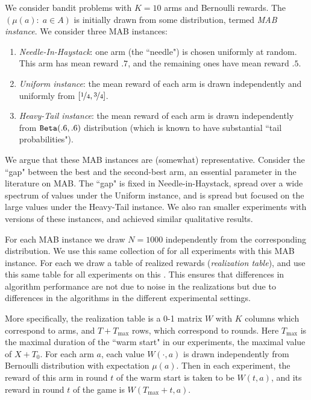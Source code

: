 \documentclass[../competing_bandits.tex]{subfiles}
\begin{document}

We consider bandit problems with $K=10$ arms and Bernoulli rewards. The \emph{\MRV} $(\mu(a):\; a\in A)$ is initially drawn from some distribution, termed \emph{MAB instance}. We consider three MAB instances:
\begin{enumerate}
\item \emph{Needle-In-Haystack}: one arm (the ``needle") is chosen uniformly at random. This arm has mean reward $.7$, and the remaining ones have mean reward $.5$.

\item \emph{Uniform instance}: the mean reward of each arm is drawn independently and uniformly from $[\nicefrac{1}{4}, \nicefrac{3}{4}]$.
\item \emph{Heavy-Tail instance}: the mean reward of each arm is drawn independently from $\mathtt{Beta}(.6,.6)$ distribution (which is known to have substantial ``tail probabilities").
\end{enumerate}
We argue that these MAB instances are (somewhat) representative. Consider the ``gap" between the best and the second-best arm, an essential parameter in the literature on MAB. The ``gap" is fixed in Needle-in-Haystack, spread over a wide spectrum of values under the Uniform instance, and is spread but  focused on the large values under the Heavy-Tail instance. We also ran smaller experiments with versions of these instances, and achieved similar qualitative results.

For each MAB instance we draw $N = 1000$ \MRVs independently from the corresponding distribution. We use this same collection of \MRVs for all experiments with this MAB instance. For each \MRV we draw a table of realized rewards (\emph{realization table}), and use this same table for all experiments on this \MRV. This ensures that differences in algorithm performance are not due to noise in the realizations but due to differences in the algorithms in the different experimental settings.

More specifically, the realization table is a 0-1 matrix $W$ with $K$ columns which correspond to arms, and $T+T_{\max}$ rows, which correspond to rounds. Here $T_{\max}$ is the maximal duration of the ``warm start" in our experiments, \ie the maximal value of $X+T_0$. For each arm $a$, each value $W(\cdot,a)$ is drawn independently from Bernoulli distribution with expectation $\mu(a)$. Then in each experiment, the reward of this arm in round $t$ of the warm start is taken to be $W(t,a)$, and its reward in round $t$ of the game is $W(T_{\max}+t,a)$.
\end{document}
